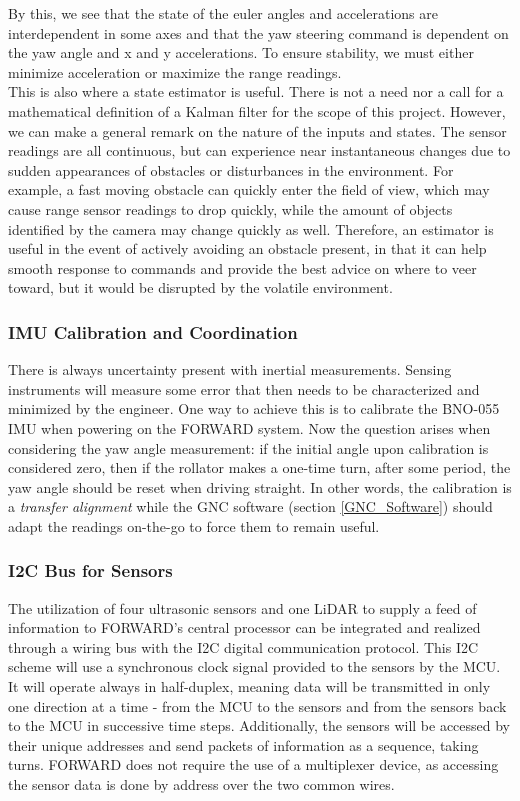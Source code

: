 \noindent By this, we see that the state of the euler angles and accelerations are interdependent in some axes and that the yaw steering command is dependent on the yaw angle and x and y accelerations. To ensure stability, we must either minimize acceleration or maximize the range readings.\\

\noindent This is also where a state estimator is useful. There is not a need nor a call for a mathematical definition of a Kalman filter for the scope of this project. However, we can make a general remark on the nature of the inputs and states. The sensor readings are all continuous, but can experience near instantaneous changes due to sudden appearances of obstacles or disturbances in the environment. For example, a fast moving obstacle can quickly enter the field of view, which may cause range sensor readings to drop quickly, while the amount of objects identified by the camera may change quickly as well. Therefore, an estimator is useful in the event of actively avoiding an obstacle present, in that it can help smooth response to commands and provide the best advice on where to veer toward, but it would be disrupted by the volatile environment.

\subsubsection{IMU Calibration and Coordination}
\noindent There is always uncertainty present with inertial measurements. Sensing instruments will measure some error that then needs to be characterized and minimized by the engineer. One way to achieve this is to calibrate the BNO-055 IMU when powering on the FORWARD system. Now the question arises when considering the yaw angle measurement: if the initial angle upon calibration is considered zero, then if the rollator makes a one-time turn, after some period, the yaw angle should be reset when driving straight. In other words, the calibration is a \textit{transfer alignment} while the GNC software (section \ref{GNC_Software}) should adapt the readings on-the-go to force them to remain useful.

\subsubsection{I2C Bus for Sensors}
\noindent The utilization of four ultrasonic sensors and one LiDAR to supply a feed of information to FORWARD's central processor can be integrated and realized through a wiring bus with the I2C digital communication protocol. This I2C scheme will use a synchronous clock signal provided to the sensors by the MCU. It will operate always in half-duplex, meaning data will be transmitted in only one direction at a time - from the MCU to the sensors and from the sensors back to the MCU in successive time steps. Additionally, the sensors will be accessed by their unique addresses and send packets of information as a sequence, taking turns. FORWARD does not require the use of a multiplexer device, as accessing the sensor data is done by address over the two common wires.